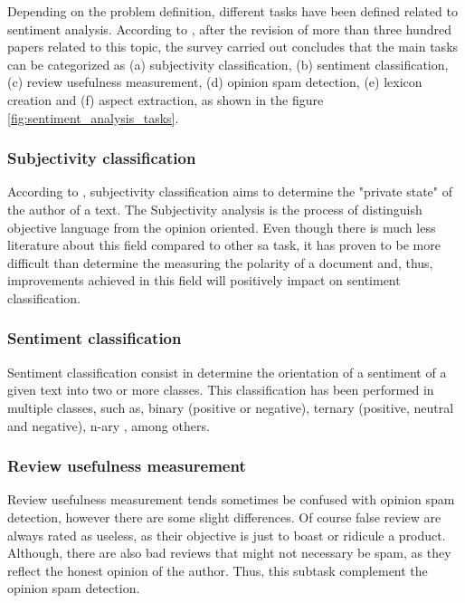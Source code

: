Depending on the problem definition, different tasks have been defined related to sentiment analysis. According to \cite{ravi2015survey}, after the revision of more than three hundred papers related to this topic, the survey carried out concludes that the main tasks can be categorized as (a) subjectivity classification, (b) sentiment classification, (c) review usefulness measurement, (d) opinion spam detection, (e) lexicon creation and (f) aspect extraction, as shown in the figure \ref{fig:sentiment_analysis_tasks}. 

\subsubsection{Subjectivity classification}
\label{subsubsection:subject_classification}

According to \cite{montoyo2012subjectivity}, subjectivity classification aims to determine the "private state" of the author of a text. The Subjectivity analysis is the process of distinguish objective language from the opinion oriented. Even though there is much less literature about this field compared to other \acrshort{sa} task, it has proven to be more difficult than determine the measuring the polarity of a document and, thus, improvements achieved in this field will positively impact on sentiment classification.

\subsubsection{Sentiment classification}
\label{subsubsection:sentiment_classification}

Sentiment classification consist in determine the orientation of a sentiment of a given text into two or more classes. This classification has been performed in multiple classes, such as, binary (positive or negative), ternary (positive, neutral and negative), n-ary \cite{nakov2016semeval}, among others.

\subsubsection{Review usefulness measurement}
\label{subsubsection:review_usefulness_measurement}

Review usefulness measurement tends sometimes be confused with opinion spam detection, however there are some slight differences. Of course false review are always rated as useless, as their objective is just to boast or ridicule a product. Although, there are also bad reviews that might not necessary be spam, as they reflect the honest opinion of the author. Thus, this subtask complement the opinion spam detection.

